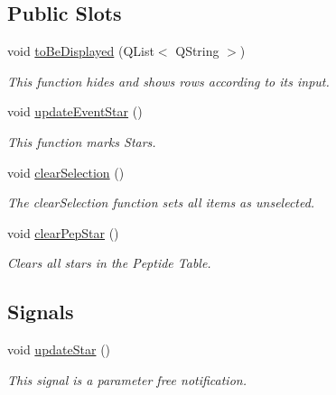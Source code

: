 \subsection*{Public Slots}
\begin{DoxyCompactItemize}
\item 
void \mbox{\hyperlink{class_peptide_view_a44ff37ec18e1e1c61c8747b6fe79e076}{to\+Be\+Displayed}} (Q\+List$<$ Q\+String $>$)
\begin{DoxyCompactList}\small\item\em This function hides and shows rows according to its input. \end{DoxyCompactList}\item 
void \mbox{\hyperlink{class_peptide_view_ab96162d2cb5e04591e6225505afceefe}{update\+Event\+Star}} ()
\begin{DoxyCompactList}\small\item\em This function marks Stars. \end{DoxyCompactList}\item 
void \mbox{\hyperlink{class_peptide_view_a8f1b5cfad280a3eb8e4a290cdef588bd}{clear\+Selection}} ()
\begin{DoxyCompactList}\small\item\em The clear\+Selection function sets all items as unselected. \end{DoxyCompactList}\item 
\mbox{\label{class_peptide_view_ab2e4b1c394cd47afec35baceedf8be07}} 
void \mbox{\hyperlink{class_peptide_view_ab2e4b1c394cd47afec35baceedf8be07}{clear\+Pep\+Star}} ()
\begin{DoxyCompactList}\small\item\em Clears all stars in the Peptide Table. \end{DoxyCompactList}\end{DoxyCompactItemize}
\subsection*{Signals}
\begin{DoxyCompactItemize}
\item 
\mbox{\label{class_peptide_view_acaeeae28c65e40998f8b9f5eaf829f71}} 
void \mbox{\hyperlink{class_peptide_view_acaeeae28c65e40998f8b9f5eaf829f71}{update\+Star}} ()
\begin{DoxyCompactList}\small\item\em This signal is a parameter free notification. \end{DoxyCompactList}\end{DoxyCompactItemize}
